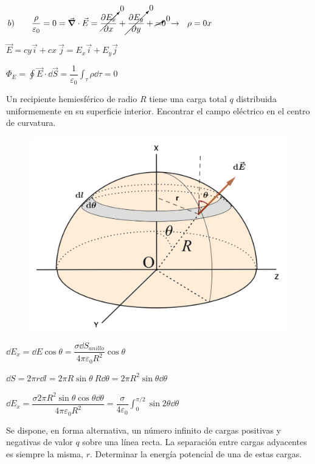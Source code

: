  $b) \qquad  
\displaystyle \dfrac {\rho}{\varepsilon_0}=0=\vec \grad \cdot \vec E=
\cancelto{0}{\pdv{E_x}{x}}+\cancelto{0}{\pdv{E_y}{y}}+\cancelto{0} = 0 \ \to \ \ \rho=0 x$

$\vec E=cy \vec i + cx\ \vec j=E_x \vec i + E_y \vec j$

$\Phi_E=\displaystyle \oint \vec E \cdot \dd \vec S =\dfrac 1 {\varepsilon_0} \int_\tau \rho \dd \tau =0$

\vspace{10mm} %
\begin{prob}
Un recipiente hemiesférico de radio $R$ tiene una carga total $q$	distribuida uniformemente en su superficie interior. Encontrar el campo eléctrico en el centro de curvatura.
\end{prob}

\begin{figure}[H]
	\centering
	\includegraphics[width=.85\textwidth]{imagenes/imagenes23/T23IM15.png}
\end{figure}

$\dd E_x=\dd E \cos \theta = \dfrac {\sigma \dd S_{anillo}}{4\pi \varepsilon_0 R^2}\cos \theta$

$\dd S=2\pi r \dd l =2\pi R \sin \theta \ R\dd \theta=2\pi R^2 \sin \theta \dd \theta$

$\displaystyle \dd E_x=\dfrac{\sigma 2 \pi R^2 \sin \theta \cos \theta \dd \theta}{4\pi \varepsilon_0 R^2}=\dfrac{\sigma}{4\varepsilon_0} \int_0^{\pi/2}\sin 2 \theta \dd \theta$

\rightline{ \textbf{\textcolor{blue}{acábese}}}

\justify

\begin{prob}
Se dispone, en forma alternativa, un número infinito de cargas positivas y negativas de valor $q$ sobre una línea recta. La separación entre cargas adyacentes es siempre la misma, $r$. Determinar la energía potencial de una de estas cargas.	
\end{prob}

